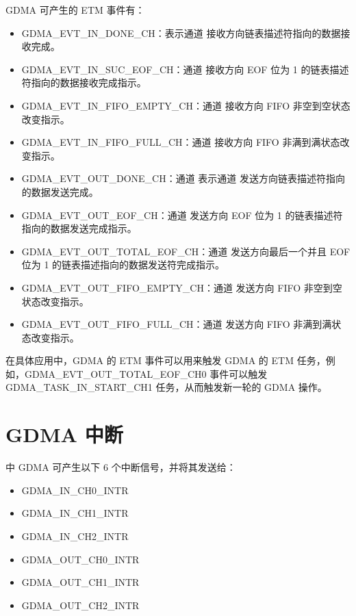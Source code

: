 \documentclass[main\_\_CN.tex]{subfiles}
\begin{document}
GDMA 可产生的 ETM 事件有：

\begin{itemize}
\item GDMA\_EVT\_IN\_DONE\_CH：表示通道  接收方向链表描述符指向的数据接收完成。
\item GDMA\_EVT\_IN\_SUC\_EOF\_CH：通道  接收方向 EOF 位为 1 的链表描述符指向的数据接收完成指示。
\item GDMA\_EVT\_IN\_FIFO\_EMPTY\_CH：通道  接收方向 FIFO 非空到空状态改变指示。
\item GDMA\_EVT\_IN\_FIFO\_FULL\_CH：通道  接收方向 FIFO 非满到满状态改变指示。
\item GDMA\_EVT\_OUT\_DONE\_CH：通道  表示通道  发送方向链表描述符指向的数据发送完成。
\item GDMA\_EVT\_OUT\_EOF\_CH：通道  发送方向 EOF 位为 1 的链表描述符指向的数据发送完成指示。
\item GDMA\_EVT\_OUT\_TOTAL\_EOF\_CH：通道  发送方向最后一个并且 EOF 位为 1 的链表描述指向的数据发送符完成指示。
\item GDMA\_EVT\_OUT\_FIFO\_EMPTY\_CH：通道  发送方向 FIFO 非空到空状态改变指示。
\item GDMA\_EVT\_OUT\_FIFO\_FULL\_CH：通道  发送方向 FIFO 非满到满状态改变指示。
\end{itemize}

在具体应用中，GDMA 的 ETM 事件可以用来触发 GDMA 的 ETM 任务，例如，GDMA\_EVT\_OUT\_TOTAL\_EOF\_CH0 事件可以触发 GDMA\_TASK\_IN\_START\_CH1 任务，从而触发新一轮的 GDMA 操作。



\section{GDMA 中断}

\chipname{} 中 GDMA 可产生以下 6 个中断信号，并将其发送给\textit{}：
\begin{itemize}
    \item GDMA\_IN\_CH0\_INTR
    \item GDMA\_IN\_CH1\_INTR
    \item GDMA\_IN\_CH2\_INTR
    \item GDMA\_OUT\_CH0\_INTR
    \item GDMA\_OUT\_CH1\_INTR
    \item GDMA\_OUT\_CH2\_INTR
\end{itemize}
\end{document}
